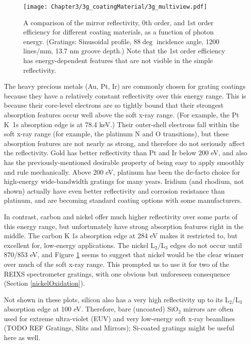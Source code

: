 \begin{figure}[htbp] %
   \centering
   \texttt{[image: Chapter3/3g\_coatingMaterial/3g\_multiview.pdf]} 
   \caption{A comparison of the mirror reflectivity, 0th order, and 1st order efficiency for different coating materials, as a function of photon energy.  (Gratings: Sinusoidal profile, 88$\deg$ incidence angle, 1200 lines/mm, 13.7 nm groove depth.)  Note that the 1st order efficiency has energy-dependent features that are not visible in the simple reflectivity.}
   \label{3g-2}
\end{figure}

The heavy precious metals (Au, Pt, Ir) are commonly chosen for grating coatings because they have a relatively constant reflectivity over this energy range.  This is because their core-level electrons are so tightly bound that their strongest absorption features occur well above the soft x-ray range.  (For example, the Pt K~1s absorption edge is at 78.4 keV.)  Their outer-shell electrons fall within the soft x-ray range (for example, the platinum N and O transitions), but these absorption features are not nearly as strong, and therefore do not seriously affect the reflectivity.  Gold has better reflectivity than Pt and Ir below 200 eV, and also has the previously-mentioned desirable property of being easy to apply smoothly and rule mechanically.  Above 200 eV, platinum has been the de-facto choice for high-energy wide-bandwidth gratings for many years.  Iridium (and rhodium, not shown) actually have even better reflectivity and corrosion resistance than platinum, and are becoming standard coating options with some manufacturers.

In contrast, carbon and nickel offer much higher reflectivity over some parts of this energy range, but unfortunately have strong absorption features right in the middle.  The carbon K 1s absorption edge at 284 eV makes it restricted to, but excellent for, low-energy applications.  The nickel L$_2$/L$_3$ edges do not occur until 870/853 eV, and Figure \ref{3g-2} seems to suggest that nickel would be the clear winner over much of the soft x-ray range.  This prompted us to use it for two of the REIXS spectrometer gratings, with one obvious but unforeseen consequence (Section \ref{nickelOxidation}).

Not shown in these plots, silicon also has a very high reflectivity up to its L$_2$/L$_3$ absorption edge at 100 eV. Therefore, bare (uncoated) SiO$_2$ mirrors are often used for extreme ultra-violet (EUV) and very low-energy soft x-ray beamlines (TODO REF Gratings, Slits and Mirrors); Si-coated gratings might be useful here as well.

